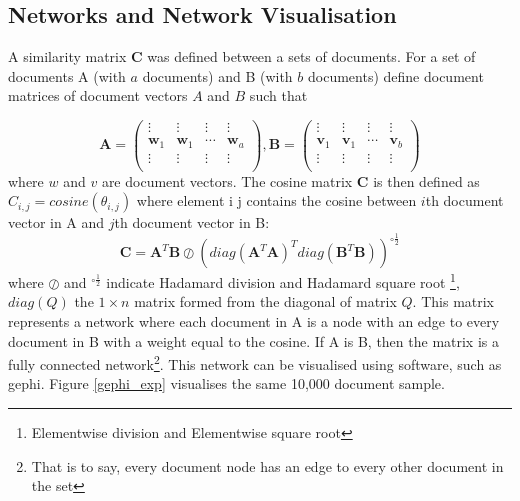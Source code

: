 \subsection{Networks and Network Visualisation}
A similarity matrix $\mathbf{C}$ was defined between a sets of documents. For a set of documents  A (with $a$ documents) and B (with $b$ documents) define document matrices of document vectors $A$ and $B$ such that 

$$\mathbf{A} = \left( \begin{array}{cccc}
\vdots & \vdots & \vdots & \vdots \\
\mathbf{w}_1 & \mathbf{w}_1 & \cdots & \mathbf{w}_a \\
\vdots & \vdots & \vdots & \vdots \\ \end{array} \right) , \mathbf{B} = \left( \begin{array}{cccc}
\vdots & \vdots & \vdots & \vdots \\
\mathbf{v}_1 & \mathbf{v}_1 & \cdots & \mathbf{v}_b \\
\vdots & \vdots & \vdots & \vdots \\ \end{array} \right)$$ where $w$ and $v$ are document vectors.
The cosine matrix $\mathbf{C}$ is then defined as $C_{i,j} = cosine \left(\theta_{i,j} \right)$ where element i j contains the cosine between $i$th document vector in A and $j$th document vector in B:
$$\mathbf{C}=\mathbf{A}^T \mathbf{B} \oslash \left( diag(\mathbf{A}^T \mathbf{A})^T diag(\mathbf{B}^T \mathbf{B}) \right)^{\circ\frac12}$$
where $\oslash$ and $^{\circ\frac12}$ indicate Hadamard division and Hadamard square root \footnote{Elementwise division and Elementwise square root}, $diag(Q)$ the $1 \times n$ matrix formed from the diagonal of matrix $Q$. This matrix represents a network where each document in A is a node with an edge to every document in B with a weight equal to the cosine. If A is B, then the matrix is a fully connected network\footnote{That is to say, every document node has an edge to every other document in the set}. This network can be visualised using software, such as gephi. Figure \ref{gephi_exp} visualises the same 10,000 document sample. 